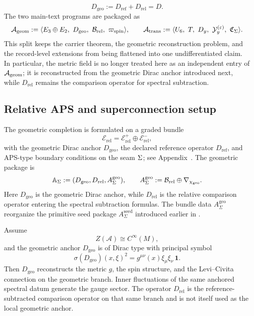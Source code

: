\[
D_{\mathrm{geo}}:=D_{\mathrm{ref}}+D_{\mathrm{rel}}=D.
\]
The two main-text programs are packaged as
\[
\Ageom
:=
\langle E_3\oplus E_2,\ D_{\mathrm{geo}},\ \mathcal B_{\mathrm{rel}},\ \wspin\rangle,
\qquad
\Atrans
:=
\langle U_6,\ T,\ D_y,\ \mathcal Y_y^{(\varepsilon)},\ \Ccyc\rangle.
\]
This split keeps the carrier theorem, the geometric reconstruction problem, and the record-level extensions from being flattened into one undifferentiated claim. In particular, the metric field is no longer treated here as an independent entry of $\mathcal A_{\mathrm{geom}}$; it is reconstructed from the geometric Dirac anchor introduced next, while $D_{\mathrm{rel}}$ remains the comparison operator for spectral subtraction.

\subsection{Relative APS and superconnection setup}

The geometric completion is formulated on a graded bundle
\[
\mathcal E_{\mathrm{rel}}=\mathcal E_{\mathrm{rel}}^+\oplus\mathcal E_{\mathrm{rel}}^-,
\]
with the geometric Dirac anchor $D_{\mathrm{geo}}$, the declared reference operator
$D_{\mathrm{ref}}$, and APS-type boundary conditions on the seam $\Sigma$; see
Appendix~. The geometric package is
\[
\mathbb A_{\Sigma}:=(D_{\mathrm{geo}},D_{\mathrm{rel}},A_{\Sigma}^{\mathrm{geo}}),
\qquad
A_{\Sigma}^{\mathrm{geo}}:=\mathcal B_{\mathrm{rel}}\oplus\nabla_{\chi_{\mathrm{geo}}}.
\]
Here $D_{\mathrm{geo}}$ is the geometric Dirac anchor, while $D_{\mathrm{rel}}$ is the relative comparison operator entering the spectral subtraction formulas. The bundle data $A_{\Sigma}^{\mathrm{geo}}$ reorganize the primitive seed package $A_{\Sigma}^{\mathrm{seed}}$ introduced earlier in .
\begin{theorem}
\label{thm:geometric-reconstruction-anchor}
\label{thm:geometric-reconstruction-from-Dgeo}
\label{thm:relative-geometric-reconstruction}
Assume
\[
Z(\mathcal A)\cong C^\infty(M),
\]
and the geometric anchor $D_{\mathrm{geo}}$ is of Dirac type with principal symbol
\[
\sigma(D_{\mathrm{geo}})(x,\xi)^2
=
g^{\mu\nu}(x)\xi_\mu\xi_\nu\,\mathbf 1.
\]
Then $D_{\mathrm{geo}}$ reconstructs the metric $g$, the spin structure, and the
Levi--Civita connection on the geometric branch. Inner fluctuations of the same anchored
spectral datum generate the gauge sector.
The operator $D_{\mathrm{rel}}$ is the reference-subtracted comparison operator on that
same branch and is not itself used as the local geometric anchor.
\end{theorem}

